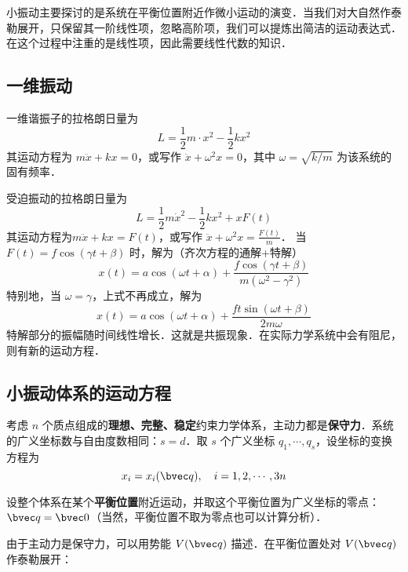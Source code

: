 

小振动主要探讨的是系统在平衡位置附近作微小运动的演变．当我们对大自然作泰勒展开，只保留其一阶线性项，忽略高阶项，我们可以提炼出简洁的运动表达式．在这个过程中注重的是线性项，因此需要线性代数的知识．

\subsection{一维振动}
一维谐振子的拉格朗日量为
\begin{equation}
L=\frac{1}{2}m\cdot{x}^2-\frac{1}{2}kx^2
\end{equation}
其运动方程为 $m\ddot {x}+kx=0$，或写作 $\ddot{x}+\omega^2 x=0$，其中 $\omega=\sqrt{k/m}$ 为该系统的固有频率．

受迫振动的拉格朗日量为 
\begin{equation}
L=\frac{1}{2}m\dot{x}^2-\frac{1}{2}kx^2+xF(t)
\end{equation}
其运动方程为$m\ddot{x}+kx=F(t)$，或写作 $\ddot{x}+\omega^2 x=\frac{F(t)}{m}$．
当 $F(t)=f\cos(\gamma t+\beta)$ 时，解为（齐次方程的通解+特解）
\begin{equation}
x(t)=a\cos(\omega t+\alpha)+\frac{f\cos(\gamma t+\beta)}{m(\omega^2-\gamma^2)}
\end{equation}
特别地，当 $\omega=\gamma$，上式不再成立，解为
\begin{equation}
x(t)=a \cos(\omega t+\alpha)+\frac{ft \sin(\omega t+\beta)}{2m\omega}
\end{equation}
特解部分的振幅随时间线性增长．这就是共振现象．在实际力学系统中会有阻尼，则有新的运动方程．

\subsection{小振动体系的运动方程}
考虑 $n$ 个质点组成的\textbf{理想、完整、稳定}约束力学体系，主动力都是\textbf{保守力}．系统的广义坐标数与自由度数相同：$s=d$．取 $s$ 个广义坐标 $q_1,\cdots,q_s$，设坐标的变换方程为
\begin{equation}
x_i = x_i(\bvec q),\ \ \  i=1,2,\cdots,3n
\end{equation}

设整个体系在某个\textbf{平衡位置}附近运动，并取这个平衡位置为广义坐标的零点：$\bvec q=\bvec 0$（当然，平衡位置不取为零点也可以计算分析）．

由于主动力是保守力，可以用势能 $V(\bvec q)$ 描述．在平衡位置处对 $V(\bvec q)$ 作泰勒展开：

